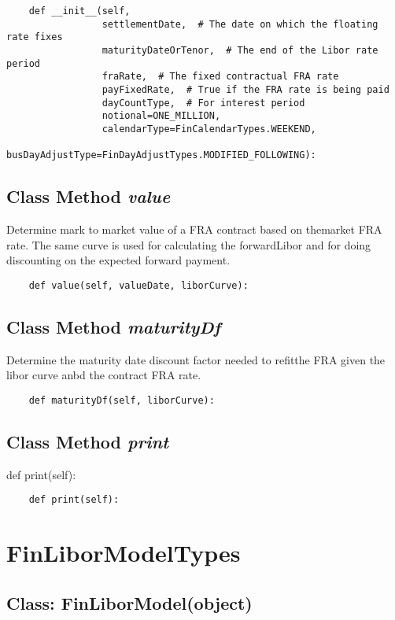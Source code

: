 \documentclass[twoside,11pt]{book}
\begin{document}
\begin{lstlisting}
    def __init__(self,
                 settlementDate,  # The date on which the floating rate fixes
                 maturityDateOrTenor,  # The end of the Libor rate period
                 fraRate,  # The fixed contractual FRA rate
                 payFixedRate,  # True if the FRA rate is being paid
                 dayCountType,  # For interest period
                 notional=ONE_MILLION,
                 calendarType=FinCalendarTypes.WEEKEND,
                 busDayAdjustType=FinDayAdjustTypes.MODIFIED_FOLLOWING):
\end{lstlisting}

\subsection{Class Method {\it value}}
Determine mark to market value of a FRA contract based on themarket FRA rate. The same curve is used for calculating the forwardLibor and for doing discounting on the expected forward payment. 

\begin{lstlisting}
    def value(self, valueDate, liborCurve):
\end{lstlisting}

\subsection{Class Method {\it maturityDf}}
Determine the maturity date discount factor needed to refitthe FRA given the libor curve anbd the contract FRA rate. 

\begin{lstlisting}
    def maturityDf(self, liborCurve):
\end{lstlisting}

\subsection{Class Method {\it print}}
def print(self):

\begin{lstlisting}
    def print(self):
\end{lstlisting}

\newpage
\section{FinLiborModelTypes}

\subsection{Class: FinLiborModel(object)}
\end{document}
